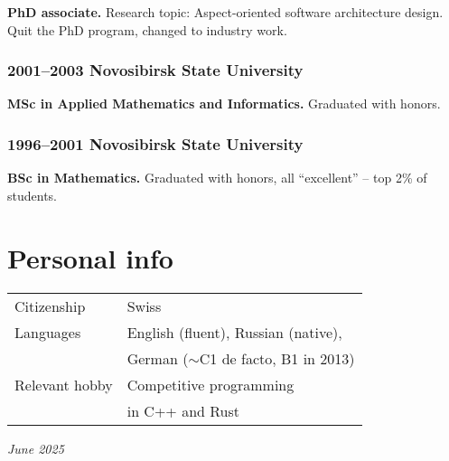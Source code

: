 \documentclass[a4paper, twocolumn, 10pt]{article}
\begin{document}
\textbf{PhD associate.} Research topic: Aspect-oriented software architecture design. Quit the PhD
program, changed to industry work.

\subsubsection*{2001--2003 Novosibirsk State University}

\textbf{MSc in Applied Mathematics and Informatics.} Graduated with honors.

\subsubsection*{1996--2001 Novosibirsk State University}

\textbf{BSc in Mathematics.} Graduated with honors, all ``excellent'' -- top 2\% of students.

\section*{Personal info}

\begin{tabular}{l l}
  \vspace{0.2cm}
  Citizenship & Swiss \\
  Languages & English (fluent), Russian (native), \\
  \vspace{0.2cm}
  & German ($\sim$C1 de facto, B1 in 2013) \\
  Relevant hobby & Competitive programming \\
  \vspace{0.2cm}
  & in C++ and Rust \\
\end{tabular}

\vspace*{\fill}
\hfill \emph{June 2025}
\end{document}
